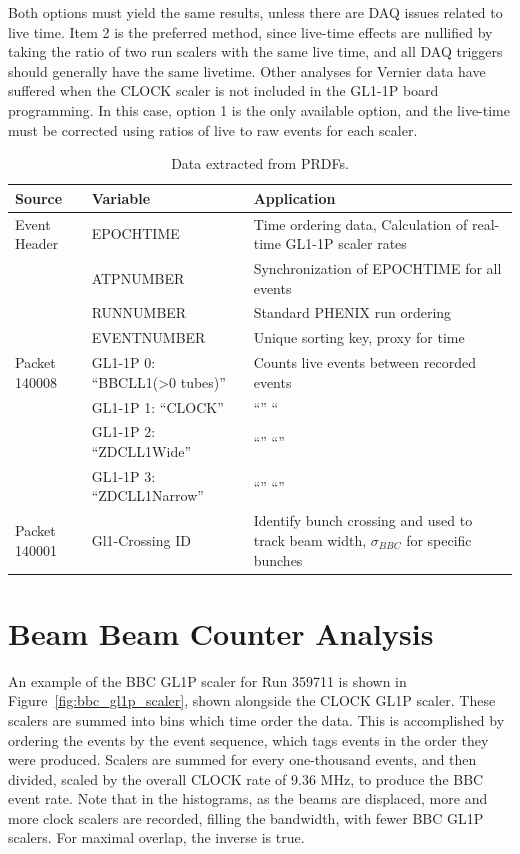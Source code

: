 Both options must yield the same results, unless there are DAQ issues related
to live time. Item 2 is the preferred method, since live-time effects are
nullified by taking the ratio of two run scalers with the same live time, and
all DAQ triggers should generally have the same livetime. Other analyses for
Vernier data have suffered when the CLOCK scaler is not included in the GL1-1P
board programming. In this case, option 1 is the only available option, and the
live-time must be corrected using ratios of live to raw events for each scaler.

\begin{table}[ht]
\centering
\begin{tabular}{ p{2cm} p{5.5 cm} p{6cm} }
\toprule
\textbf{Source} & \textbf{Variable} & \textbf{Application} \\
\midrule 
Event Header & EPOCHTIME & Time ordering data, Calculation of real-time GL1-1P scaler rates \\
 & ATPNUMBER & Synchronization of EPOCHTIME for all events \\
 & RUNNUMBER & Standard PHENIX run ordering  \\
 & EVENTNUMBER & Unique sorting key, proxy for time \\
\midrule
Packet 140008 & GL1-1P 0: ``BBCLL1(\textgreater0 tubes)'' & Counts live events between recorded events \\
              & GL1-1P 1: ``CLOCK'' &  ``'' `` \\
              & GL1-1P 2: ``ZDCLL1Wide''& ``'' ``''\\
              & GL1-1P 3: ``ZDCLL1Narrow''& ``'' ``'' \\
\midrule
Packet 140001 & Gl1-Crossing ID & Identify bunch crossing and used to track beam width, $\sigma_{BBC}$  for specific bunches\\
\bottomrule
\end{tabular}
\caption{ Data extracted from PRDFs. }
\label{tab:prdf_data_summary}
\end{table}

\section{Beam Beam Counter Analysis}
\label{sec:bbc_rate}

An example of the BBC GL1P scaler for Run 359711 is shown in
Figure~\ref{fig:bbc_gl1p_scaler}, shown alongside the CLOCK GL1P scaler. These
scalers are summed into bins which time order the data. This is accomplished by
ordering the events by the event sequence, which tags events in the order they
were produced. Scalers are summed for every one-thousand events, and then
divided, scaled by the overall CLOCK rate of 9.36 MHz, to produce the BBC event
rate. Note that in the histograms, as the beams are displaced, more and more
clock scalers are recorded, filling the bandwidth, with fewer BBC GL1P scalers.
For maximal overlap, the inverse is true.

